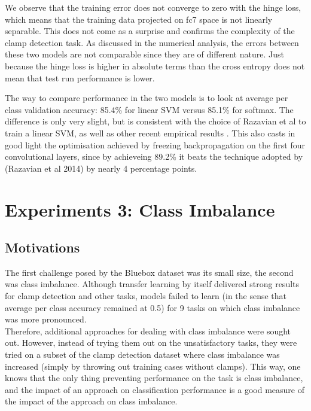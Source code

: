 \documentclass[a4paper,11pt]{article}
\begin{document}
We observe that the training error does not converge to zero with the hinge loss, which means that the training data projected on fc7 space is not linearly separable. This does not come as a surprise and confirms the complexity of the clamp detection task. As discussed in the numerical analysis, the errors between these two models are not comparable since they are of different nature. Just because the hinge loss is higher in absolute terms than the cross entropy does not mean that test run performance is lower. 

The way to compare performance in the two models is to look at average per class validation accuracy: 85.4\% for linear SVM versus 85.1\% for softmax. The difference is only very slight, but is consistent with the choice of Razavian et al to train a linear SVM, as well as other recent empirical results \cite{svm-nn}. This also casts in good light the optimisation achieved by freezing backpropagation on the first four convolutional layers, since by achieveing 89.2\% it beats the technique adopted by (Razavian et al 2014) by nearly 4 percentage points.


\clearpage
\section{Experiments 3: Class Imbalance}

\subsection{Motivations}

The first challenge posed by the Bluebox dataset was its small size, the second was class imbalance. Although transfer learning by itself delivered strong results for clamp detection and other tasks, models failed to learn (in the sense that average per class accuracy remained at 0.5) for 9 tasks on which class imbalance was more pronounced. \\

Therefore, additional approaches for dealing with class imbalance were sought out. However, instead of trying them out on the unsatisfactory tasks, they were tried on a subset of the clamp detection dataset where class imbalance was increased (simply by throwing out training cases without clamps). This way, one knows that the only thing preventing performance on the task is class imbalance, and the impact of an approach on classification performance is a good measure of the impact of the approach on class imbalance. \\
\end{document}
